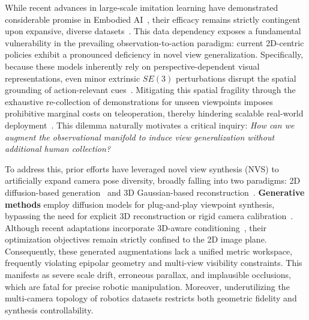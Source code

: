 While recent advances in large-scale imitation learning have demonstrated considerable promise in Embodied AI~\cite{zhao2025cot,black2410pi0,zitkovich2023rt,brohan2022rt,team2024octo,driess2023palm}, their efficacy remains strictly contingent upon expansive, diverse datasets~\cite{o2024open,khazatsky2024droid,walke2023bridgedata,dasari2019robonet}. This data dependency exposes a fundamental vulnerability in the prevailing observation-to-action paradigm: current 2D-centric policies exhibit a pronounced deficiency in novel view generalization. Specifically, because these models inherently rely on perspective-dependent visual representations, even minor extrinsic $SE(3)$ perturbations disrupt the spatial grounding of action-relevant cues~\cite{pumacay2024colosseum,gao2024efficient,abouzeid2025geoaware,pang2025learning}. Mitigating this spatial fragility through the exhaustive re-collection of demonstrations for unseen viewpoints imposes prohibitive marginal costs on teleoperation, thereby hindering scalable real-world deployment~\cite{sadeghi2018sim2real,khazatsky2024droid}. This dilemma naturally motivates a critical inquiry: \textit{How can we augment the observational manifold to induce view generalization without additional human collection?}


To address this, prior efforts have leveraged novel view synthesis (NVS) to artificially expand camera pose diversity, broadly falling into two paradigms: 2D diffusion-based generation~\cite{seo2024genwarp,van2024generative,yang2023movie,zhou2025stable,sargent2024zeronvs} and 3D Gaussian-based reconstruction~\cite{yang2025novel,torne2024robot,li2024robogsim,yu2025real2render2real}.
\textbf{Generative methods} employ diffusion models for plug-and-play viewpoint synthesis, bypassing the need for explicit 3D reconstruction or rigid camera calibration~\cite{yang2023movie,chen2024rovi,tian2024view,shi2025nvspolicy}. Although recent adaptations incorporate 3D-aware conditioning~\cite{sargent2024zeronvs,lu2025movis}, their optimization objectives remain strictly confined to the 2D image plane. Consequently, these generated augmentations lack a unified metric workspace, frequently violating epipolar geometry and multi-view visibility constraints. 
This manifests as severe scale drift, erroneous parallax, and implausible occlusions, which are fatal for precise robotic manipulation. Moreover, underutilizing the multi-camera topology of robotics datasets restricts both geometric fidelity and synthesis controllability.



